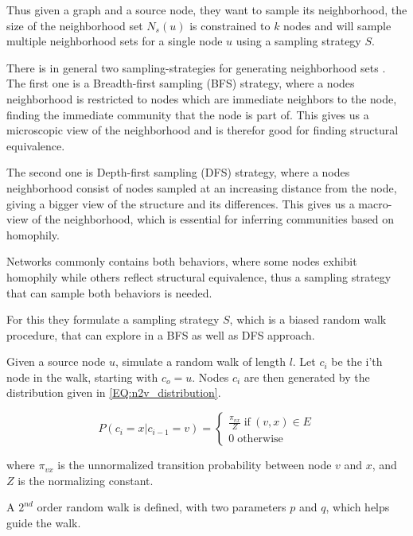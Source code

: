Thus given a graph and a source node, they want to sample its neighborhood, the size of the neighborhood set $N_s(u)$ is constrained to $k$ nodes and will sample multiple neighborhood sets for a single node $u$ using a sampling strategy $S$.

There is in general two sampling-strategies for generating neighborhood sets \cite{Node2vec}. The first one is a Breadth-first sampling (BFS) strategy, where a nodes neighborhood is restricted to nodes which are immediate neighbors to the node, finding the immediate community that the node is part of. This gives us a microscopic view of the neighborhood and is therefor good for finding structural equivalence.

The second one is Depth-first sampling (DFS) strategy, where a nodes neighborhood consist of nodes sampled at an increasing distance from the node, giving a bigger view of the structure and its differences. This gives us a macro-view of the neighborhood, which is essential for inferring communities based on homophily.

Networks commonly contains both behaviors, where some nodes exhibit homophily while others reflect structural equivalence, thus a sampling strategy that can sample both behaviors is needed.

For this they formulate a sampling strategy $S$, which is a biased random walk procedure, that can explore in a BFS as well as DFS approach.

Given a source node $u$, simulate a random walk of length $l$. Let $c_i$ be the i'th node in the walk, starting with $c_o = u$. Nodes $c_i$ are then generated by the distribution given in \autoref{EQ:n2v_distribution}.

\begin{equation}\label{EQ:n2v_distribution}
P(c_i = x | c_{i-1} = v) = 
\begin{cases} 
	\frac{\pi_{vx}}{Z}  \; \text{if} \: (v,x) \in E \\
	0 \; \text{otherwise}
\end{cases}
\end{equation}

where $\pi_{vx}$ is the unnormalized transition probability between node $v$ and $x$, and $Z$ is the normalizing constant.

A $2^{nd}$ order random walk is defined, with two parameters $p$ and $q$, which helps guide the walk.


